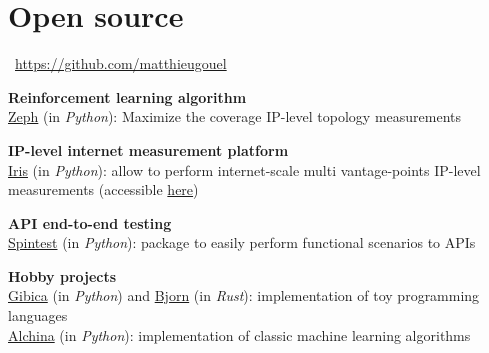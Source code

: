 \documentclass[11pt,a4paper,sans]{moderncv} %
\begin{document}



\section{Open source}

\faGithub~\href{https://github.com/matthieugouel}{https://github.com/matthieugouel}
\vspace{+0.25cm}

\textbf{Reinforcement learning algorithm}\\
\href{https://github.com/dioptra-io/zeph}{Zeph} (in \emph{Python}): Maximize the coverage IP-level topology measurements

\vspace{+0.25cm}
\textbf{IP-level internet measurement platform}\\
\href{https://github.com/dioptra-io/iris}{Iris} (in \emph{Python}): allow to perform internet-scale multi vantage-points IP-level measurements (accessible \href{https://iris.dioptra.io/#/}{here})

\vspace{+0.25cm}
\textbf{API end-to-end testing}\\
\href{https://github.com/societe-generale/spintest}{Spintest} (in \emph{Python}): package to easily perform functional scenarios to APIs

\vspace{+0.25cm}
\textbf{Hobby projects}\\
\href{https://github.com/matthieugouel/gibica}{Gibica} (in \emph{Python}) and \href{https://github.com/matthieugouel/bjorn}{Bjorn} (in \emph{Rust}): implementation of toy programming languages\\
\href{https://github.com/matthieugouel/alchina}{Alchina} (in \emph{Python}): implementation of classic machine learning algorithms

\end{document}
